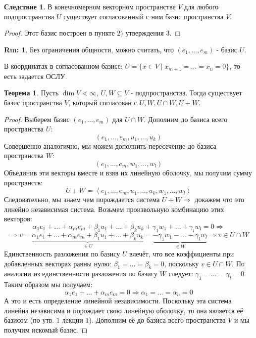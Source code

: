 \documentclass[12pt]{article}
\theoremstyle{definition}
\newtheorem{rem}{Rm:}
\newtheorem{theorem}{Теорема}
\newtheorem{corollary}{Следствие}
\newcommand{\linsp}[1]{\left\langle #1 \right\rangle }
\begin{document}
\begin{corollary}
	В конечномерном векторном пространстве $V$ для любого подпространства $U$ существует согласованный с ним базис пространства $V$. 
\end{corollary}
\begin{proof}
	Этот базис построен в пункте $2)$ утверждения $3$.
\end{proof}
\begin{rem}
	Без ограничения общности, можно считать, что $(e_1,\dotsc, e_m)$ - базис $U$.
\end{rem}
В координатах в согласованном базисе: $U = \{x \in V \mid x_{m+1} = \dotsc = x_n = 0\}$, то есть задается ОСЛУ.
\newpage
\begin{theorem}
	Пусть $\dim{V} < \infty$, $U ,W \subseteq V$ - подпространства. Тогда существует базис пространства $V$, который согласован с $U, W, U \cap W, U + W$.
\end{theorem}
\begin{proof}
	Выберем базис $(e_1, \dotsc, e_m)$ для $U\cap W$. Дополним до базиса всего пространства $U$:
	$$
		(e_1, \dotsc, e_m, u_1, \dotsc, u_k)
	$$
	Совершенно аналогично, мы можем дополнить пересечение до базиса пространства $W$:
	$$
		(e_1, \dotsc, e_m, w_1, \dotsc, w_l)
	$$
	Объединив эти векторы вместе и взяв их линейную оболочку, мы получим сумму пространств:
	$$
		U + W = \linsp{e_1, \dotsc, e_m, u_1, \dotsc, u_k, w_1, \dotsc, w_l}
	$$
	Следовательно, мы знаем чем порождается система $U + W \Rightarrow$ докажем что это линейно независимая система. Возьмем произвольную комбинацию этих векторов:
	$$
		\alpha_1 e_1 + \dotsc + \alpha_m e_m + \beta_1 u_1 + \dotsc + \beta_k u_k + \gamma_1 w_1 + \dotsc + \gamma_l w_l =0 \Rightarrow
	$$
	$$
		\Rightarrow v = \underbrace{\alpha_1 e_1 + \dotsc + \alpha_m e_m + \beta_1 u_1 + \dotsc + \beta_k u_k}_{\in U}  = \underbrace{-\gamma_1 w_1 - \dotsc - \gamma_l w_l}_{\in W} \Rightarrow v \in U \cap W
	$$
	Единственность разложения по базису $U$ влечёт, что все коэффициенты при добавленных векторах равны нулю: $\beta_1 = \dotsc  =\beta_k = 0$, поскольку $v \in U \cap W$. По аналогии из единственности разложения по базису $W$ следует: $\gamma_1 = \dotsc = \gamma_l = 0$. Таким образом мы получаем:
	$$
		\alpha_1 e_1 + \dotsc + \alpha_m e_m = 0 \Rightarrow \alpha_1 = \dotsc = \alpha_n = 0
	$$
	А это и есть определение линейной независимости. Поскольку эта система линейна независима и порождает свою линейную оболочку, то она является её базисом (по утв. $1$ лекции $1$). Дополним её до базиса всего пространства $V$ и мы получим искомый базис.
\end{proof}
\end{document}
